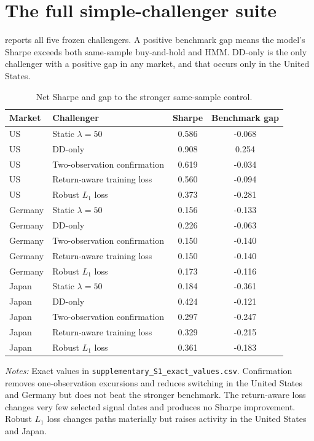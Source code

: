 \documentclass[11pt]{article}
\begin{document}
\clearpage
\appendix

\section{The full simple-challenger suite}
\label{app:suite}

 reports all five frozen challengers. A positive benchmark gap
means the model's Sharpe exceeds both same-sample buy-and-hold and HMM. DD-only
is the only challenger with a positive gap in any market, and that occurs only in
the United States.

\begin{table}[t]
\centering
\caption{Net Sharpe and gap to the stronger same-sample control.}
\label{tab:suite}
\small
\begin{threeparttable}
\begin{tabular}{l l S[table-format=1.3] S[table-format=-1.3]}
\toprule
Market & Challenger & {Sharpe} & {Benchmark gap} \\
\midrule
US & Static $\lambda=50$            & 0.586 & -0.068 \\
US & DD-only                        & 0.908 &  0.254 \\
US & Two-observation confirmation   & 0.619 & -0.034 \\
US & Return-aware training loss     & 0.560 & -0.094 \\
US & Robust $L_1$ loss              & 0.373 & -0.281 \\
\addlinespace
Germany & Static $\lambda=50$          & 0.156 & -0.133 \\
Germany & DD-only                      & 0.226 & -0.063 \\
Germany & Two-observation confirmation & 0.150 & -0.140 \\
Germany & Return-aware training loss   & 0.150 & -0.140 \\
Germany & Robust $L_1$ loss            & 0.173 & -0.116 \\
\addlinespace
Japan & Static $\lambda=50$          & 0.184 & -0.361 \\
Japan & DD-only                      & 0.424 & -0.121 \\
Japan & Two-observation confirmation & 0.297 & -0.247 \\
Japan & Return-aware training loss   & 0.329 & -0.215 \\
Japan & Robust $L_1$ loss            & 0.361 & -0.183 \\
\bottomrule
\end{tabular}
\begin{tablenotes}[flushleft]\footnotesize
\item \emph{Notes:} Exact values in \texttt{supplementary\_S1\_exact\_values.csv}.
Confirmation removes one-observation excursions and reduces switching in the
United States and Germany but does not beat the stronger benchmark. The
return-aware loss changes very few selected signal dates and produces no Sharpe
improvement. Robust $L_1$ loss changes paths materially but raises activity in
the United States and Japan.
\end{tablenotes}
\end{threeparttable}
\end{table}
\end{document}
